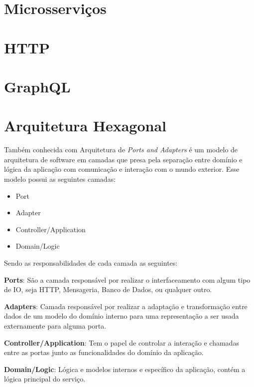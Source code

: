 \documentclass[twosideprint]{politex}
\begin{document}
	\section{Microsserviços}
	
	\section{HTTP}
	
	\section{GraphQL}
	
	\section{Arquitetura Hexagonal}
	
	Também conhecida com Arquitetura de \textit{Ports and Adapters} é um modelo de arquitetura de software em camadas que presa pela separação entre domínio e lógica da aplicação com comunicação e interação com o mundo exterior. Esse modelo possui as seguintes camadas:
	
	\begin{itemize}
	    \item Port
	    \item Adapter
	    \item Controller/Application
	    \item Domain/Logic
	\end{itemize}
	
	Sendo as responsabilidades de cada camada as seguintes:
	
	\textbf{Ports}: São a camada responsável por realizar o interfaceamento com algum tipo de IO, seja HTTP, Mensageria, Banco de Dados, ou qualquer outro.
	
	\textbf{Adapters}: Camada responsável por realizar a adaptação e transformação entre dados de um modelo do domínio interno para uma representação a ser usada externamente para alguma porta.
	
	\textbf{Controller/Application}: Tem o papel de controlar a interação e chamadas entre as portas junto as funcionalidades do domínio da aplicação.
	
	\textbf{Domain/Logic}: Lógica e modelos internos e específico da aplicação, contém a lógica principal do serviço.
	
\end{document}
